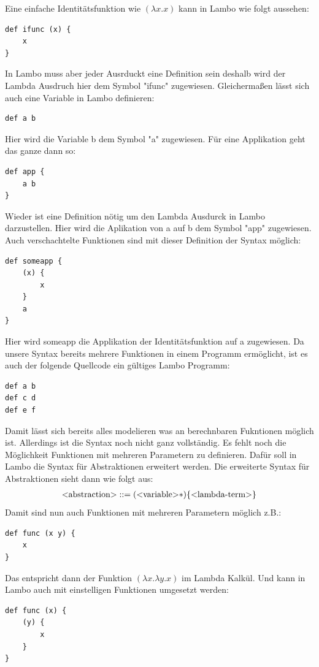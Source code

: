 \documentclass[ngerman]{article}
\begin{document}
Eine einfache Identitätsfunktion wie $(\lambda x.x)$ kann in Lambo wie folgt aussehen:
\begin{lstlisting}
def ifunc (x) {
    x
}
\end{lstlisting}
In Lambo muss aber jeder Ausrduckt eine Definition sein deshalb wird der Lambda Ausdruch hier dem Symbol "ifunc" zugewiesen. Gleichermaßen lässt sich auch eine Variable in Lambo definieren:
\begin{lstlisting}
def a b
\end{lstlisting}
Hier wird die Variable b dem Symbol "a" zugewiesen. Für eine Applikation geht das ganze dann so:
\begin{lstlisting}
def app {
    a b
}
\end{lstlisting}
Wieder ist eine Definition nötig um den Lambda Ausdurck in Lambo darzustellen. Hier wird die Aplikation von a auf b dem Symbol "app" zugewiesen. Auch verschachtelte Funktionen sind mit dieser Definition der Syntax möglich:
\begin{lstlisting}
def someapp {
    (x) {
        x
    }
    a
}
\end{lstlisting}
Hier wird someapp die Applikation der Identitätsfunktion auf a zugewiesen. 
Da unsere Syntax bereits mehrere Funktionen in einem Programm ermöglicht, ist es auch der folgende Quellcode ein gültiges Lambo Programm:
\begin{lstlisting}
def a b
def c d
def e f
\end{lstlisting}
Damit lässt sich bereits alles modelieren was an berechnbaren Fukntionen möglich ist. Allerdings ist die Syntax noch nicht ganz vollständig. Es fehlt noch die Möglichkeit Funktionen mit mehreren Parametern zu definieren. Dafür soll in Lambo die Syntax für Abstraktionen erweitert werden. Die erweiterte Syntax für Abstraktionen sieht dann wie folgt aus:
\begin{align*}
    \text{\textless abstraction\textgreater} & ::= (\text{\textless variable\textgreater}*)\{\text{\textless lambda-term\textgreater}\}\\
\end{align*}
Damit sind nun auch Funktionen mit mehreren Parametern möglich z.B.:
\begin{lstlisting}
def func (x y) {
    x
}
\end{lstlisting}
Das entspricht dann der Funktion $(\lambda x.\lambda y.x)$ im Lambda Kalkül. Und kann in Lambo auch mit einstelligen Funktionen umgesetzt werden:
\begin{lstlisting}
def func (x) {
    (y) {
        x
    }
}
\end{lstlisting}
\end{document}
